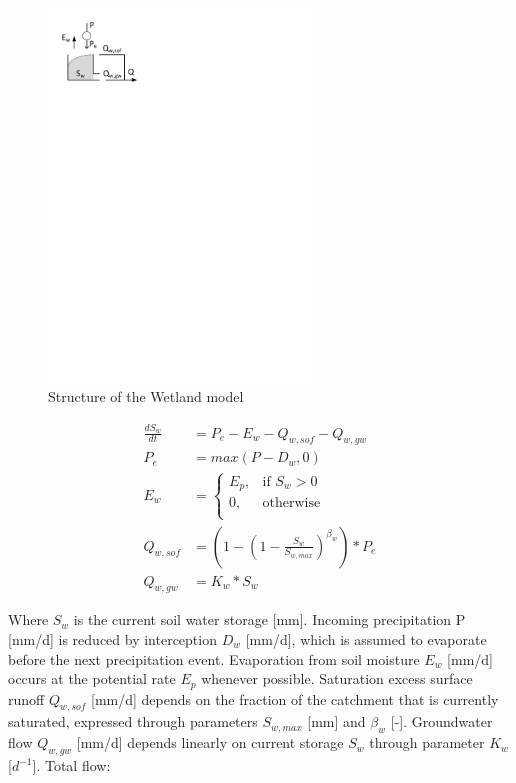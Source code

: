 { 																	%
\begin{figure}
\includegraphics[trim=1cm 24cm 9cm 1cm,width=7cm,keepaspectratio]{./files/02_schematic.pdf}
\caption{Structure of the Wetland model} \label{fig:02_schematic}
\end{figure}

\begin{align}
	\frac{dS_w}{dt} &= P_e-E_w-Q_{w,sof}-Q_{w,gw} \\
	P_e &= max(P-D_w,0)\\
	E_w &= 
	\begin{cases}
		E_p, & \text{if } S_w > 0 \\
		0, & \text{otherwise}\\
	\end{cases}\\
	Q_{w,sof} &= \left(1-\left(1-\frac{S_w}{S_{w,max}}\right)^{\beta_w}\right)*P_e\\
	Q_{w,gw} &= K_w * S_w
\end{align}

} %

Where $S_w$ is the current soil water storage [mm]. Incoming precipitation P [mm/d] is reduced by interception $D_w$ [mm/d], which is assumed to evaporate before the next precipitation event. Evaporation from soil moisture $E_w$ [mm/d] occurs at the potential rate $E_p$ whenever possible. Saturation excess surface runoff $Q_{w,sof}$ [mm/d] depends on the fraction of the catchment that is currently saturated, expressed through parameters $S_{w,max}$ [mm] and $\beta_w$ [-]. Groundwater flow $Q_{w,gw}$ [mm/d] depends linearly on current storage $S_w$ through parameter $K_w$ [$d^{-1}$]. Total flow:


